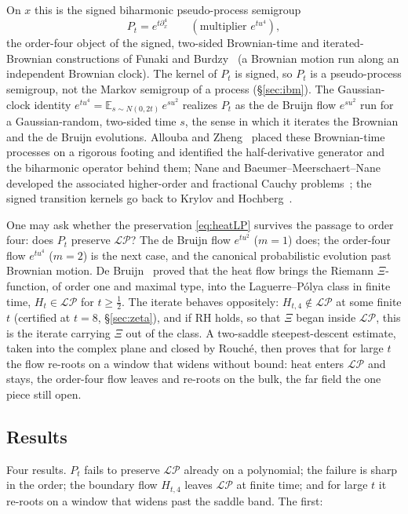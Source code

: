 \documentclass[11pt,reqno]{amsart}
\theoremstyle{plain}
\theoremstyle{definition}
\theoremstyle{remark}
\newcommand{\E}{\mathbb E}
\newcommand{\LP}{\mathcal{LP}}
\begin{document}
On $x$ this is the signed biharmonic pseudo-process semigroup
\begin{equation}\label{eq:P4}
   P_t=e^{t\partial_x^4}\qquad(\text{multiplier }e^{tu^4}),
\end{equation}
the order-four object of the signed, two-sided Brownian-time and
iterated-Brownian constructions of Funaki and Burdzy~\cite{Funaki,Burdzy} (a
Brownian motion run along an independent Brownian clock). The kernel of $P_t$ is
signed, so $P_t$ is a pseudo-process semigroup, not the Markov semigroup of a
process (\S\ref{sec:ibm}). The Gaussian-clock identity
$e^{tu^4}=\E_{s\sim N(0,2t)}\,e^{su^2}$ realizes $P_t$ as the de Bruijn flow
$e^{su^2}$ run for a Gaussian-random, two-sided time $s$, the sense in which it
iterates the Brownian and the de Bruijn evolutions. Allouba and Zheng~\cite{AlloubaZheng}
placed these Brownian-time processes on a rigorous footing and identified the
half-derivative generator and the biharmonic operator behind them; Nane and
Baeumer--Meerschaert--Nane developed the associated higher-order and fractional
Cauchy problems~\cite{Nane,BMN}; the signed transition kernels go back to Krylov
and Hochberg~\cite{Krylov,Hochberg}.

One may ask whether the preservation \eqref{eq:heatLP} survives the
passage to order four: does $P_t$ preserve $\LP$? The de Bruijn flow $e^{tu^2}$
($m=1$) does; the order-four flow $e^{tu^4}$ ($m=2$) is the next case, and the
canonical probabilistic evolution past Brownian motion. De
Bruijn~\cite{deBruijn} proved that the heat flow brings the Riemann
$\Xi$-function, of order one and maximal type, into the Laguerre--P\'olya
class in finite time, $H_t\in\LP$ for $t\ge\tfrac12$. The iterate behaves
oppositely: $H_{t,4}\notin\LP$ at some finite $t$ (certified at $t=8$,
\S\ref{sec:zeta}), and if RH holds, so that $\Xi$ began inside $\LP$, this is the
iterate carrying $\Xi$ out of the class. A two-saddle steepest-descent estimate,
taken into the complex plane and closed by Rouch\'e, then proves that for large
$t$ the flow re-roots on a window that widens without bound: heat enters $\LP$
and stays, the order-four flow leaves and re-roots on the bulk, the far field
the one piece still open.

\subsection*{Results}
Four results. $P_t$ fails to preserve $\LP$ already on a polynomial; the failure
is sharp in the order; the boundary flow $H_{t,4}$ leaves $\LP$ at finite time;
and for large $t$ it re-roots on a window that widens past the saddle band. The
first:
\end{document}

